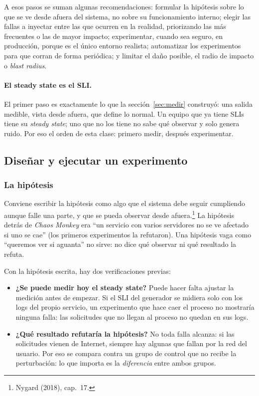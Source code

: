 \documentclass[variant=apuntes,cover=institutional,mode=screen]{ua-engineering-v6-article}
\begin{document}
A esos pasos se suman algunas recomendaciones: formular la hipótesis sobre lo que se ve desde afuera del sistema, no sobre su funcionamiento interno; elegir las fallas a inyectar entre las que ocurren en la realidad, priorizando las más frecuentes o las de mayor impacto; experimentar, cuando sea seguro, en producción, porque es el único entorno realista; automatizar los experimentos para que corran de forma periódica; y limitar el daño posible, el radio de impacto o \emph{blast radius}.

\paragraph{El steady state es el SLI.} El primer paso es exactamente lo que la sección~\ref{sec:medir} construyó: una salida medible, vista desde afuera, que define lo normal. Un equipo que ya tiene SLIs tiene su \emph{steady state}; uno que no los tiene no sabe qué observar y solo genera ruido. Por eso el orden de esta clase: primero medir, después experimentar.

\subsection{Diseñar y ejecutar un experimento}

\subsubsection{La hipótesis}

Conviene escribir la hipótesis como algo que el sistema debe seguir cumpliendo aunque falle una parte, y que se pueda observar desde afuera.\footnote{Nygard (2018), cap.~17.} La hipótesis detrás de \emph{Chaos Monkey} era ``un servicio con varios servidores no se ve afectado si uno se cae'' (los primeros experimentos la refutaron). Una hipótesis vaga como ``queremos ver si aguanta'' no sirve: no dice qué observar ni qué resultado la refuta.

Con la hipótesis escrita, hay dos verificaciones previas:
\begin{itemize}
\item \textbf{¿Se puede medir hoy el steady state?} Puede hacer falta ajustar la medición antes de empezar. Si el SLI del generador se midiera solo con los logs del propio servicio, un experimento que hace caer el proceso no mostraría ninguna falla: las solicitudes que no llegan al proceso no quedan en sus logs.
\item \textbf{¿Qué resultado refutaría la hipótesis?} No toda falla alcanza: si las solicitudes vienen de Internet, siempre hay algunas que fallan por la red del usuario. Por eso se compara contra un grupo de control que no recibe la perturbación: lo que importa es la \emph{diferencia} entre ambos grupos.
\end{itemize}
\end{document}
